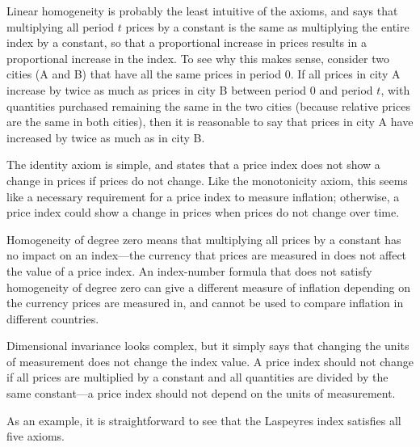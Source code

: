 \documentclass[
]{article}
\begin{document}
Linear homogeneity is probably the least intuitive of the axioms, and says that multiplying all period \(t\) prices by a constant is the same as multiplying the entire index by a constant, so that a proportional increase in prices results in a proportional increase in the index. To see why this makes sense, consider two cities (A and B) that have all the same prices in period 0. If all prices in city A increase by twice as much as prices in city B between period 0 and period \(t\), with quantities purchased remaining the same in the two cities (because relative prices are the same in both cities), then it is reasonable to say that prices in city A have increased by twice as much as in city B.

The identity axiom is simple, and states that a price index does not show a change in prices if prices do not change. Like the monotonicity axiom, this seems like a necessary requirement for a price index to measure inflation; otherwise, a price index could show a change in prices when prices do not change over time.

Homogeneity of degree zero means that multiplying all prices by a constant has no impact on an index---the currency that prices are measured in does not affect the value of a price index. An index-number formula that does not satisfy homogeneity of degree zero can give a different measure of inflation depending on the currency prices are measured in, and cannot be used to compare inflation in different countries.

Dimensional invariance looks complex, but it simply says that changing the units of measurement does not change the index value. A price index should not change if all prices are multiplied by a constant and all quantities are divided by the same constant---a price index should not depend on the units of measurement.

As an example, it is straightforward to see that the Laspeyres index satisfies all five axioms.
\end{document}
